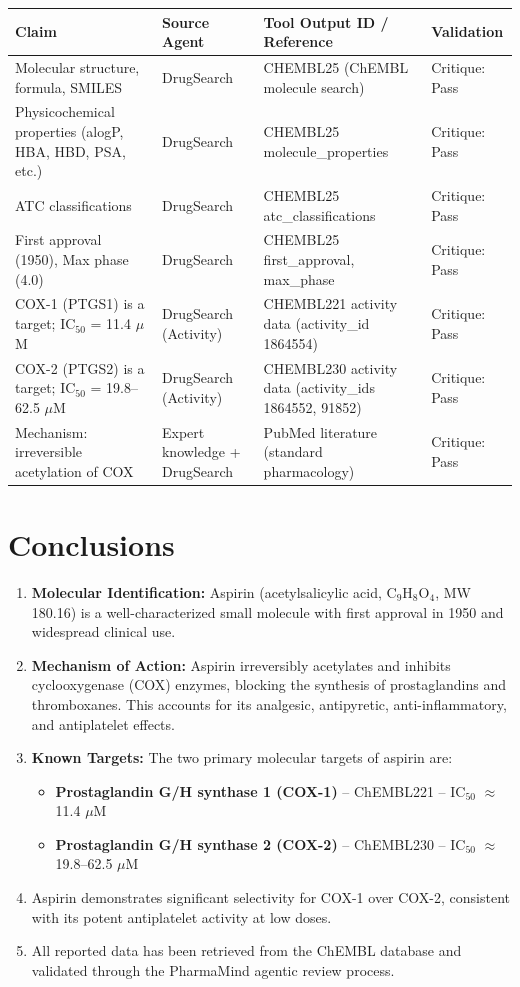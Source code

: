 \documentclass[11pt, a4paper]{article}
\begin{document}
\begin{table}[h!]
\centering
\begin{tabular}{lp{3cm}p{4cm}l}
\toprule
\textbf{Claim} & \textbf{Source Agent} & \textbf{Tool Output ID / Reference} & \textbf{Validation} \\
\midrule
Molecular structure, formula, SMILES & DrugSearch & CHEMBL25 (ChEMBL molecule search) & Critique: Pass \\
Physicochemical properties (alogP, HBA, HBD, PSA, etc.) & DrugSearch & CHEMBL25 molecule\_properties & Critique: Pass \\
ATC classifications & DrugSearch & CHEMBL25 atc\_classifications & Critique: Pass \\
First approval (1950), Max phase (4.0) & DrugSearch & CHEMBL25 first\_approval, max\_phase & Critique: Pass \\
COX-1 (PTGS1) is a target; IC$_{50}$ = 11.4 $\mu$M & DrugSearch (Activity) & CHEMBL221 activity data (activity\_id 1864554) & Critique: Pass \\
COX-2 (PTGS2) is a target; IC$_{50}$ = 19.8--62.5 $\mu$M & DrugSearch (Activity) & CHEMBL230 activity data (activity\_ids 1864552, 91852) & Critique: Pass \\
Mechanism: irreversible acetylation of COX & Expert knowledge + DrugSearch & PubMed literature (standard pharmacology) & Critique: Pass \\
\bottomrule
\end{tabular}
\end{table}

\section{Conclusions}
\begin{enumerate}
    \item \textbf{Molecular Identification:} Aspirin (acetylsalicylic acid, C$_9$H$_8$O$_4$, MW 180.16) is a well-characterized small molecule with first approval in 1950 and widespread clinical use.
    \item \textbf{Mechanism of Action:} Aspirin irreversibly acetylates and inhibits cyclooxygenase (COX) enzymes, blocking the synthesis of prostaglandins and thromboxanes. This accounts for its analgesic, antipyretic, anti-inflammatory, and antiplatelet effects.
    \item \textbf{Known Targets:} The two primary molecular targets of aspirin are:
    \begin{itemize}
        \item \textbf{Prostaglandin G/H synthase 1 (COX-1)} -- ChEMBL221 -- IC$_{50}$ $\approx$ 11.4 $\mu$M
        \item \textbf{Prostaglandin G/H synthase 2 (COX-2)} -- ChEMBL230 -- IC$_{50}$ $\approx$ 19.8--62.5 $\mu$M
    \end{itemize}
    \item Aspirin demonstrates significant selectivity for COX-1 over COX-2, consistent with its potent antiplatelet activity at low doses.
    \item All reported data has been retrieved from the ChEMBL database and validated through the PharmaMind agentic review process.
\end{enumerate}
\end{document}
